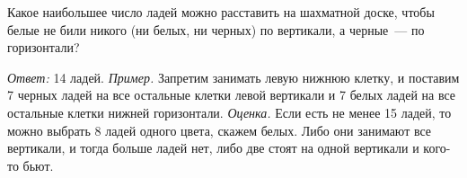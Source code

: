 Какое наибольшее число ладей можно расставить на шахматной доске, чтобы белые
не били никого (ни белых, ни черных) по вертикали, а черные~--- по горизонтали?

\solution
\emph{Ответ:} 14 ладей.
\emph{Пример.}
Запретим занимать левую нижнюю клетку, и поставим 7 черных ладей на все
остальные клетки левой вертикали и 7 белых ладей на все остальные клетки нижней
горизонтали.
\emph{Оценка.}
Если есть не менее 15 ладей, то можно выбрать 8 ладей одного цвета, скажем
белых.
Либо они занимают все вертикали, и тогда больше ладей нет, либо две стоят на
одной вертикали и кого-то бьют.

